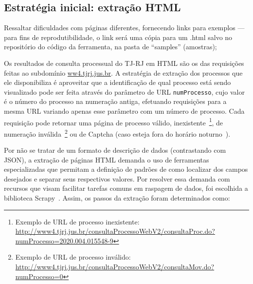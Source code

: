 
\subsection{Estratégia inicial: extração HTML}

\begin{todolist}
    \item Ressaltar dificuldades com páginas diferentes, fornecendo links para
          exemplos --- para fins de reprodutibilidade, o link será uma cópia
          para um .html salvo no repositório do código da ferramenta, na pasta
          de ``samples'' (amostras);
\end{todolist}


Os resultados de consulta processual do TJ-RJ em HTML são os das requisições
feitas ao subdomínio \url{ww4.tjrj.jus.br}. A estratégia de extração dos
processos que ele disponibiliza é aproveitar que a identificação de qual
processo está sendo visualizado pode ser feita através do parâmetro de URL
\texttt{numProcesso}, cujo valor é o número do processo na numeração antiga,
efetuando requisições para a mesma URL variando apenas esse parâmetro com um
número de processo. Cada requisição pode retornar uma página de processo
válido, inexistente~\footnote{Exemplo de URL de processo inexistente:
\url{http://www4.tjrj.jus.br/consultaProcessoWebV2/consultaProc.do?numProcesso=2020.004.015548-9}},
de numeração inválida~\footnote{Exemplo de URL de processo inválido:
\url{http://www4.tjrj.jus.br/consultaProcessoWebV2/consultaMov.do?numProcesso=0}}
ou de Captcha (caso esteja fora do horário noturno~).

Por não se tratar de um formato de descrição de dados (contrastando com JSON),
a extração de páginas HTML demanda o uso de ferramentas especializadas que
permitam a definição de padrões de como localizar dos campos desejados e
separar seus respectivos valores. Por resolver essa demanda com recursos que
visam facilitar tarefas comuns em raspagem de dados, foi escolhida a biblioteca
Scrapy~\cite{lib:scrapy}. Assim, os passos da extração foram determinados como:

